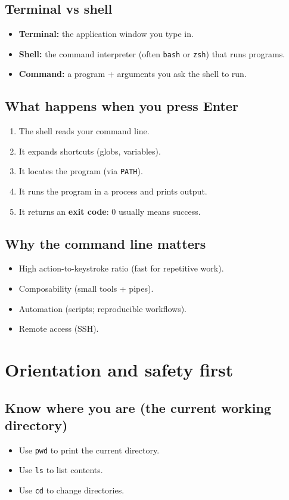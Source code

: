 \subsection{Terminal vs shell}
\begin{itemize}
\item \textbf{Terminal:} the application window you type in.
\item \textbf{Shell:} the command interpreter (often \texttt{bash} or \texttt{zsh}) that runs programs.
\item \textbf{Command:} a program + arguments you ask the shell to run.
\end{itemize}

\subsection{What happens when you press Enter}
\begin{enumerate}
\item The shell reads your command line.
\item It expands shortcuts (globs, variables).
\item It locates the program (via \texttt{PATH}).
\item It runs the program in a process and prints output.
\item It returns an \textbf{exit code}: 0 usually means success.
\end{enumerate}

\subsection{Why the command line matters}
\begin{itemize}
\item High action-to-keystroke ratio (fast for repetitive work).
\item Composability (small tools + pipes).
\item Automation (scripts; reproducible workflows).
\item Remote access (SSH).
\end{itemize}

\section{Orientation and safety first}
\subsection{Know where you are (the current working directory)}
\begin{itemize}
\item Use \texttt{pwd} to print the current directory.
\item Use \texttt{ls} to list contents.
\item Use \texttt{cd} to change directories.
\end{itemize}

